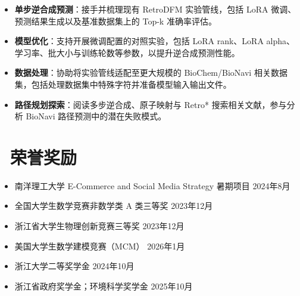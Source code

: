 \documentclass[11pt]{article}
\newlength{\intraProjectListTopSep}
\begin{document}
\begin{itemize}[nosep, topsep=\intraProjectListTopSep]
    \item \textbf{单步逆合成预测}：接手并梳理现有 RetroDFM 实验管线，包括 LoRA 微调、预测结果生成以及基准数据集上的 Top-k 准确率评估。
    \item \textbf{模型优化}：支持开展微调配置的对照实验，包括 LoRA rank、LoRA alpha、学习率、批大小与训练轮数等参数，以提升逆合成预测性能。
    \item \textbf{数据处理}：协助将实验管线适配至更大规模的 BioChem/BioNavi 相关数据集，包括处理数据集中特殊字符并准备模型输入输出文件。
    \item \textbf{路径规划探索}：阅读多步逆合成、原子映射与 Retro* 搜索相关文献，参与分析 BioNavi 路径预测中的潜在失败模式。
\end{itemize}

\section{\makebox[\widthof{\faGraduationCap}][c]{\color{CVBlue}\faList}\ 荣誉奖励}

\begin{itemize}
    \item 南洋理工大学 E-Commerce and Social Media Strategy 暑期项目 \hfill 2024年8月
    \item 全国大学生数学竞赛非数学类 A 类三等奖 \hfill 2023年12月
    \item 浙江省大学生物理创新竞赛三等奖 \hfill 2023年12月
    \item 美国大学生数学建模竞赛（MCM） \hfill 2026年1月
    \item 浙江大学二等奖学金 \hfill 2024年10月
    \item 浙江省政府奖学金；环境科学奖学金 \hfill 2025年10月
\end{itemize}
\end{document}
